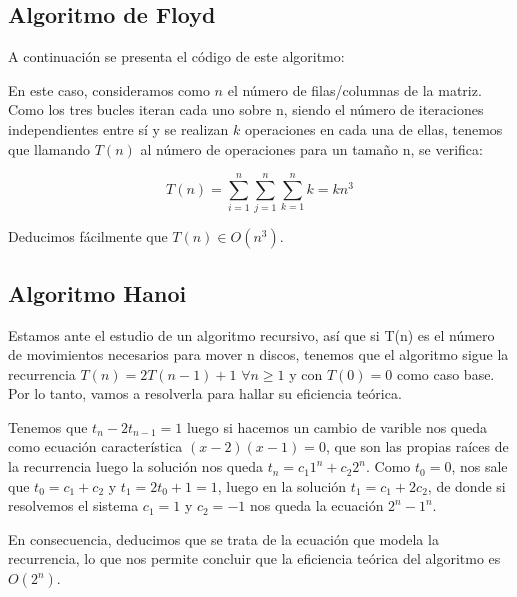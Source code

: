 \documentclass{homework}
\begin{document}
    \subsection{Algoritmo de Floyd}

    A continuación se presenta el código de este algoritmo:

    

    En este caso, consideramos como $n$ el número de filas/columnas de la matriz. Como los tres bucles iteran cada uno sobre n, siendo el número de iteraciones
    independientes entre sí y se realizan $k$ operaciones en cada una de ellas, tenemos que llamando $T(n)$ al número de operaciones para un tamaño n, se verifica:
    
    \begin{equation*}
        T(n) = \sum_{i=1}^n \sum_{j=1}^{n} \sum_{k=1}^{n} k = kn^3
    \end{equation*}

    Deducimos fácilmente que $T(n) \in O(n^3)$. 
    
    \subsection{Algoritmo Hanoi}
    
     

    Estamos ante el estudio de un algoritmo recursivo, así que si T(n) es el número de movimientos necesarios para mover n discos, tenemos que el algoritmo sigue la 
    recurrencia $T(n) = 2T(n-1) + 1$ $\forall n \geq 1$ y con $T(0) = 0$ como caso base. Por lo tanto, vamos a resolverla para hallar su eficiencia teórica.

    Tenemos que $t_n - 2t_{n-1} = 1 $ luego si hacemos un cambio de varible nos queda como ecuación característica $(x-2)(x-1) = 0$, que son las propias raíces de la 
    recurrencia luego la solución nos queda $t_n = c_1 1^n  + c_2 2^n  $. Como $t_0=0$, nos sale que $t_0 = c_1 + c_2$ y $t_1 = 2 t_0 + 1 = 1$, luego en la 
    solución $t_1=c_1 + 2 c_2 $, de donde si resolvemos el sistema $c_1 = 1$ y $c_2 = -1$ nos queda la ecuación $2^n - 1^n$. 
    
    En consecuencia, deducimos que se trata de la ecuación que 
    modela la recurrencia, lo que nos permite concluir que la eficiencia teórica del algoritmo es $O(2^n)$.
\end{document}
